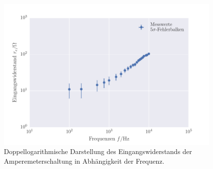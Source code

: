 \FloatBarrier
\begin{figure}[!h]
\centering
\includegraphics[scale=1]{../Grafiken/Amperemeter_Eingangswiderstand.pdf}
\caption{Doppellogarithmische Darstellung des Eingangswiderstands der Amperemeterschaltung
	in Abhängigkeit der Frequenz. \label{fig:amperemeter_eingangswiderstand}}
\end{figure}
\FloatBarrier